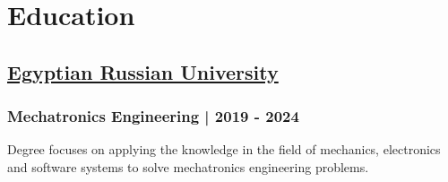 \section*{Education}
%
%
%
\subsection*{
  \href{https://www.eru.edu.eg/}{Egyptian Russian University}
}
\subsubsection*{Mechatronics Engineering | 2019 - 2024}
Degree focuses on applying the knowledge in the field of mechanics, electronics
and software systems to solve mechatronics engineering problems.